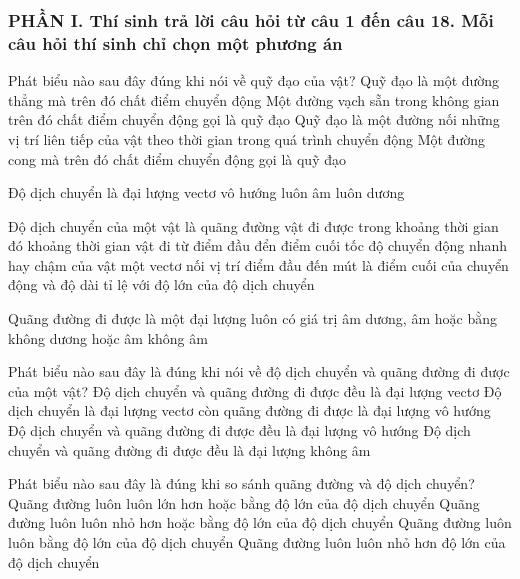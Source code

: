 \subsubsection*{PHẦN I. Thí sinh trả lời câu hỏi từ câu 1 đến câu 18. Mỗi câu hỏi thí sinh chỉ chọn một phương án}
\setcounter{ex}{0}
\begin{ex}%
Phát biểu nào sau đây đúng khi nói về quỹ đạo của vật?
\choice
{Quỹ đạo là một đường thẳng mà trên đó chất điểm chuyển động}
{Một đường vạch sẵn trong không gian trên đó chất điểm chuyển động gọi là quỹ đạo}
{\True Quỹ đạo là một đường nối những vị trí liên tiếp của vật theo thời gian trong quá trình chuyển động}
{Một đường cong mà trên đó chất điểm chuyển động gọi là quỹ đạo}
\loigiai{
}
 \end{ex}
\begin{ex}%
Độ dịch chuyển là đại lượng
\choice
{\True vectơ}
{vô hướng}
{luôn âm}
{luôn dương}

\loigiai{
}
 \end{ex}
\begin{ex}%
Độ dịch chuyển của một vật là
\choice
{quãng đường vật đi được trong khoảng thời gian đó}
{khoảng thời gian vật đi từ điểm đầu đển điểm cuối}
{tốc độ chuyển động nhanh hay chậm của vật}
{\True một vectơ nối vị trí điểm đầu đến mút là điểm cuối của chuyển động và độ dài tỉ lệ với độ lớn của độ dịch chuyển}

\loigiai{
}
 \end{ex}	
\begin{ex}%
Quãng đường đi được là một đại lượng luôn có giá trị
\choice
{âm}
{dương, âm hoặc bằng không}
{dương hoặc âm}
{\True không âm}
\loigiai{
}
 \end{ex}	
\begin{ex}%
Phát biểu nào sau đây là đúng khi nói về độ dịch chuyển và quãng đường đi được của một vật?
\choice
{Độ dịch chuyển và quãng đường đi được đều là đại lượng vectơ}
{\True Độ dịch chuyển là đại lượng vectơ còn quãng đường đi được là đại lượng vô hướng}
{Độ dịch chuyển và quãng đường đi được đều là đại lượng vô hướng}
{Độ dịch chuyển và quãng đường đi được đều là đại lượng không âm}

\loigiai{
}
 \end{ex}	
\begin{ex}%
Phát biểu nào sau đây là đúng khi so sánh quãng đường và độ dịch chuyển? 
\choice
{\True Quãng đường luôn luôn lớn hơn hoặc bằng độ lớn của độ dịch chuyển}
{Quãng đường luôn luôn nhỏ hơn hoặc bằng độ lớn của độ dịch chuyển}
{Quãng đường luôn luôn bằng độ lớn của độ dịch chuyển}
{Quãng đường luôn luôn nhỏ hơn độ lớn của độ dịch chuyển}

\loigiai{
}
 \end{ex}	

